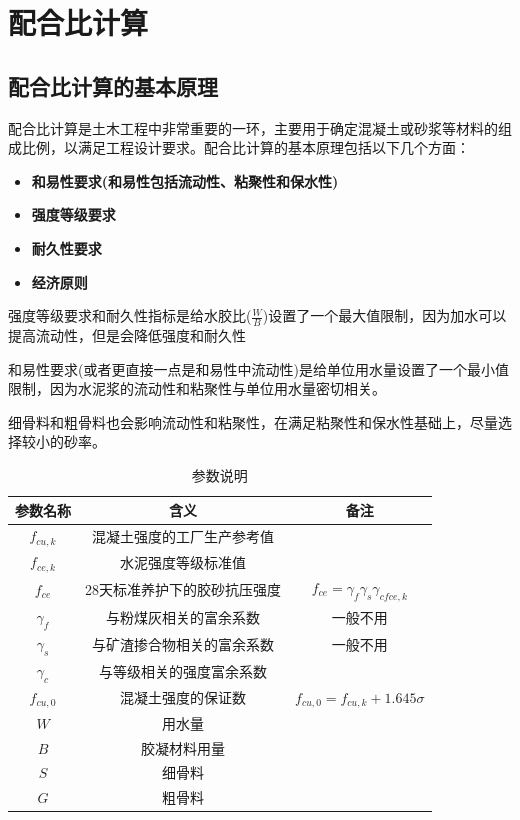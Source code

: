 \documentclass[12pt, a4paper, oneside, UTF8]{ctexbook}
\begin{document}

\else
\fi

\chapter{配合比计算}

\section{配合比计算的基本原理}
配合比计算是土木工程中非常重要的一环，主要用于确定混凝土或砂浆等材料的组成比例，以满足工程设计要求。配合比计算的基本原理包括以下几个方面：
\begin{itemize}
	\item \textbf{和易性要求(和易性包括流动性、粘聚性和保水性)}
	\item \textbf{强度等级要求}
	\item \textbf{耐久性要求}
	\item \textbf{经济原则}
\end{itemize}

\begin{corollary}
	{
		{\color{red}强度等级要求和耐久性指标}是给水胶比($\frac{W}{B}$)设置了一个最大值限制，因为加水可以提高流动性，但是会降低强度和耐久性

		和易性要求(或者更直接一点是和易性中流动性)是给单位用水量设置了一个最小值限制，因为水泥浆的流动性和粘聚性与单位用水量密切相关。
		
		细骨料和粗骨料也会影响流动性和粘聚性，{\color{red}在满足粘聚性和保水性基础上，尽量选择较小的砂率。}
		}
\end{corollary}

\begin{table}[H]
	\centering
	\renewcommand{\arraystretch}{1.5}
	\setlength{\tabcolsep}{30pt}
	\begin{tabular}{|c|c|c|}
		\hline
		参数名称 & 含义 & 备注 \\
		\hline
		$f_{cu,k}$ & 混凝土强度的工厂生产参考值 &  \\
		\hline
		$f_{ce,k}$ & 水泥强度等级标准值 &  \\
		\hline
		$f_{ce}$ & 28天标准养护下的胶砂抗压强度 &  $f_{ce} = \gamma_f \gamma_s \gamma_{cfce,k}$\\
		\hline
		$\gamma_f$ & 与粉煤灰相关的富余系数 &	一般不用  \\
		\hline
		$\gamma_s$ & 与矿渣掺合物相关的富余系数 & 一般不用 \\
		\hline
		$\gamma_c$ & 与等级相关的强度富余系数 &  \\
		\hline
		$f_{cu,0}$ & 混凝土强度的保证数 & $f_{cu,0} = f_{cu,k}+ 1.645 \sigma$ \\
		\hline
		$W$ & 用水量 &  \\
		\hline
		$B$ & 胶凝材料用量 &  \\
		\hline
		$S$ & 细骨料 &  \\
		\hline
		$G$ & 粗骨料 &  \\
		\hline
	\end{tabular}
	\caption{参数说明}
\end{table}
\end{document}
